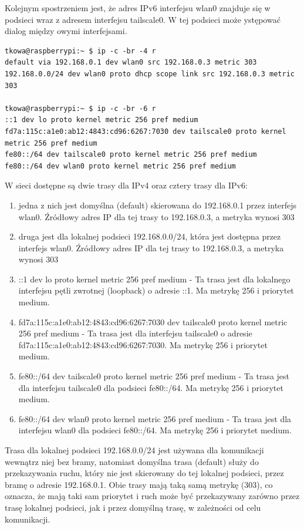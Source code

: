 \documentclass{article}
\begin{document}
Kolejnym spostrzeniem jest, że adres IPv6 interfejsu wlan0 znajduje się w podsieci wraz z adresem interfejsu tailscale0. W tej podsieci może ystępować dialog między owymi interfejsami. 

\begin{lstlisting}
tkowa@raspberrypi:~ $ ip -c -br -4 r
default via 192.168.0.1 dev wlan0 src 192.168.0.3 metric 303
192.168.0.0/24 dev wlan0 proto dhcp scope link src 192.168.0.3 metric 303

tkowa@raspberrypi:~ $ ip -c -br -6 r
::1 dev lo proto kernel metric 256 pref medium
fd7a:115c:a1e0:ab12:4843:cd96:6267:7030 dev tailscale0 proto kernel metric 256 pref medium
fe80::/64 dev tailscale0 proto kernel metric 256 pref medium
fe80::/64 dev wlan0 proto kernel metric 256 pref medium
\end{lstlisting}

W sieci dostępne są dwie trasy dla IPv4 oraz cztery trasy dla IPv6:
\begin{enumerate}[label=\textbullet]
  \item jedna z nich jest domyślna (default) skierowana do 192.168.0.1 przez interfejs wlan0. Źródłowy adres IP dla tej trasy to 192.168.0.3, a metryka wynosi 303
  \item druga jest dla lokalnej podsieci 192.168.0.0/24, która jest dostępna przez interfejs wlan0. Źródłowy adres IP dla tej trasy to 192.168.0.3, a metryka wynosi 303
  \item ::1 dev lo proto kernel metric 256 pref medium - Ta trasa jest dla lokalnego interfejsu pętli zwrotnej (loopback) o adresie ::1. Ma metrykę 256 i priorytet medium.
  \item fd7a:115c:a1e0:ab12:4843:cd96:6267:7030 dev tailscale0 proto kernel metric 256 pref medium - Ta trasa jest dla interfejsu tailscale0 o adresie fd7a:115c:a1e0:ab12:4843:cd96:6267:7030. Ma metrykę 256 i priorytet medium.
  \item fe80::/64 dev tailscale0 proto kernel metric 256 pref medium - Ta trasa jest dla interfejsu tailscale0 dla podsieci fe80::/64. Ma metrykę 256 i priorytet medium.
  \item fe80::/64 dev wlan0 proto kernel metric 256 pref medium - Ta trasa jest dla interfejsu wlan0 dla podsieci fe80::/64. Ma metrykę 256 i priorytet medium.
\end{enumerate}
Trasa dla lokalnej podsieci 192.168.0.0/24 jest używana dla komunikacji wewnątrz niej bez bramy, natomiast domyślna trasa (default) służy do przekazywania ruchu, który nie jest skierowany do tej lokalnej podsieci, przez bramę o adresie 192.168.0.1. Obie trasy mają taką samą metrykę (303), co oznacza, że mają taki sam priorytet i ruch może być przekazywany zarówno przez trasę lokalnej podsieci, jak i przez domyślną trasę, w zależności od celu komunikacji.\\
\end{document}
